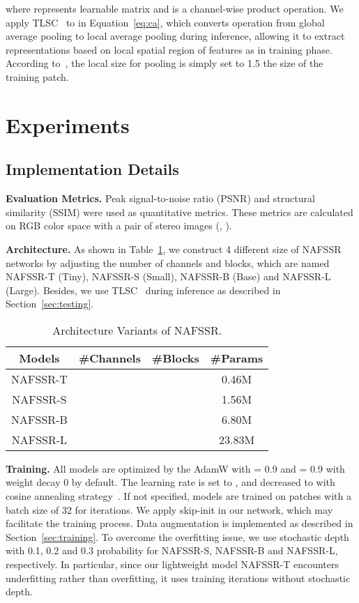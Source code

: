\documentclass[10pt,twocolumn,letterpaper]{article}
\begin{document}
where  represents learnable matrix and  is a channel-wise product operation. 
We apply TLSC~\cite{chu2021tlsc} to  in Equation~\ref{eq:ca}, which converts  operation from global average pooling to local average pooling during inference, allowing it to extract representations based on local spatial region of features as in training phase. According to~\cite{chu2021tlsc}, the local size for pooling is simply set to 1.5 the size of the training patch. 


\vspace{-1mm}



 \section{Experiments}
\subsection{Implementation Details}\label{sec:NTIRE.details}
\textbf{Evaluation Metrics.}
Peak signal-to-noise ratio (PSNR) and structural similarity (SSIM) were used as quantitative metrics. 
These metrics are calculated on RGB color space with a pair of stereo images (\ie, ).

\textbf{Architecture.}
As shown in Table~\ref{tab:arch}, we construct 4 different size of NAFSSR networks by adjusting the number of channels and blocks, which are named NAFSSR-T (Tiny), NAFSSR-S (Small), NAFSSR-B (Base) and NAFSSR-L (Large).  Besides, we use TLSC~\cite{chu2021tlsc} during inference as described in Section~\ref{sec:testing}.
\begin{table}[]
\caption{Architecture Variants of NAFSSR.}
\vspace{-3mm}
\label{tab:arch}
\centering
\begin{tabular}{cccc}
\toprule
Models & \#Channels & \#Blocks & \#Params \\ \midrule
NAFSSR-T &   &  & 0.46M\\
NAFSSR-S &  &  & 1.56M \\
NAFSSR-B &  &  & 6.80M \\
NAFSSR-L &  &  & 23.83M\\
\bottomrule
\end{tabular}
\vspace{-2mm}
\end{table}

\textbf{Training.} All models are optimized by the AdamW with  = 0.9 and  = 0.9 with weight decay 0 by default.
The learning rate is set to , and decreased to  with cosine annealing strategy~\cite{loshchilov2016sgdr}.
If not specified, models are trained on  patches with a batch size of 32 for  iterations.
We apply skip-init\cite{de2020batch} in our network, which may facilitate the training process.
Data augmentation is implemented as described in Section~\ref{sec:training}. To overcome the overfitting issue, we use stochastic depth~\cite{huang2016deep} with 0.1, 0.2 and 0.3 probability for NAFSSR-S, NAFSSR-B and NAFSSR-L, respectively. In particular, since our lightweight model NAFSSR-T encounters underfitting rather than overfitting, it uses  training iterations without stochastic depth.
\end{document}
